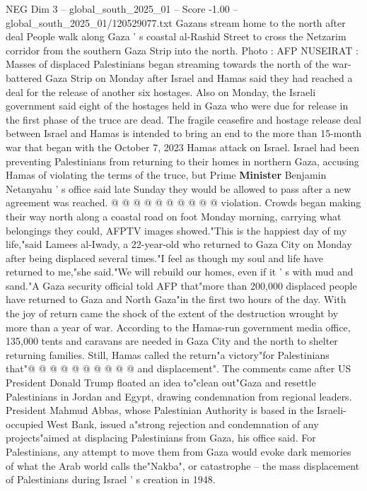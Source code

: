 \begin{textsample}{NEG Dim 3 – global\_south\_2025\_01 – Score -1.00 – global\_south\_2025\_01/120529077.txt}  \label{ex:f3_neg_060}
Gazans stream home to the north after deal People walk along Gaza ' s coastal al-Rashid Street to cross the Netzarim corridor from the southern Gaza Strip into the north.
Photo : AFP NUSEIRAT : Masses of displaced Palestinians began streaming towards the north of the war-battered Gaza Strip on Monday after Israel and Hamas said they had reached a deal for the release of another six hostages.
Also on Monday, the Israeli government said eight of the hostages held in Gaza who were due for release in the first phase of the truce are dead.
The fragile ceasefire and hostage release deal between Israel and Hamas is intended to bring an end to the more than 15-month war that began with the October 7, 2023 Hamas attack on Israel.
Israel had been preventing Palestinians from returning to their homes in northern Gaza, accusing Hamas of violating the terms of the truce, but Prime \textbf{Minister} Benjamin Netanyahu ' s office said late Sunday they would be allowed to pass after a new agreement was reached. @ @ @ @ @ @ @ @ @ @ violation.
Crowds began making their way north along a coastal road on foot Monday morning, carrying what belongings they could, AFPTV images showed."This is the happiest day of my life,"said Lamees al-Iwady, a 22-year-old who returned to Gaza City on Monday after being displaced several times."I feel as though my soul and life have returned to me,"she said."We will rebuild our homes, even if it ' s with mud and sand."A Gaza security official told AFP that"more than 200,000 displaced people have returned to Gaza and North Gaza"in the first two hours of the day.
With the joy of return came the shock of the extent of the destruction wrought by more than a year of war.
According to the Hamas-run government media office, 135,000 tents and caravans are needed in Gaza City and the north to shelter returning families.
Still, Hamas called the return"a victory"for Palestinians that"@ @ @ @ @ @ @ @ @ @ and displacement".
The comments came after US President Donald Trump floated an idea to"clean out"Gaza and resettle Palestinians in Jordan and Egypt, drawing condemnation from regional leaders.
President Mahmud Abbas, whose Palestinian Authority is based in the Israeli-occupied West Bank, issued a"strong rejection and condemnation of any projects"aimed at displacing Palestinians from Gaza, his office said.
For Palestinians, any attempt to move them from Gaza would evoke dark memories of what the Arab world calls the"Nakba", or catastrophe -- the mass displacement of Palestinians during Israel ' s creation in 1948.

\end{textsample}
